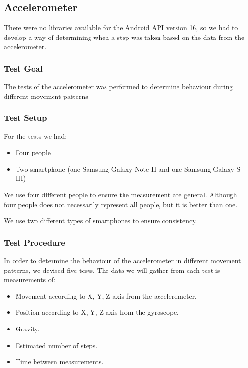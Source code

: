 \subsection{Accelerometer}
There were no libraries available for the Android API version 16, so we had to develop a way of determining when a step was taken based on the data from the accelerometer.

\subsubsection{Test Goal}
The tests of the accelerometer was performed to determine behaviour during different movement patterns. 

\subsubsection{Test Setup}
For the tests we had:
\begin{itemize}
\item Four people
\item Two smartphone (one Samsung Galaxy Note II and one Samsung Galaxy S III)
\end{itemize}

We use four different people to ensure the measurement are general.
Although four people does not necessarily represent all people, but it is better than one.

We use two different types of smartphones to ensure consistency.

\subsubsection{Test Procedure}
In order to determine the behaviour of the accelerometer in different movement patterns, we devised five tests.
The data we will gather from each test is measurements of:
\begin{itemize}
\item Movement according to X, Y, Z axis from the accelerometer.
\item Position according to X, Y, Z axis from the gyroscope.
\item Gravity.
\item Estimated number of steps.
\item Time between measurements.
\end{itemize}

